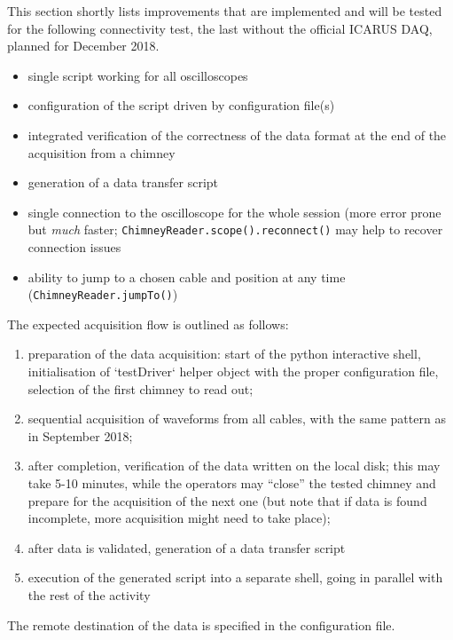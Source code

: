 This section shortly lists improvements that are implemented and will be tested
for the following connectivity test, the last without the official ICARUS DAQ,
planned for December 2018.
\begin{itemize}
  \item single script working for all oscilloscopes
  \item configuration of the script driven by configuration file(s)
  \item integrated verification of the correctness of the data format at the end
        of the acquisition from a chimney
  \item generation of a data transfer script
  \item single connection to the oscilloscope for the whole session (more error
        prone but \emph{much} faster; \texttt{ChimneyReader.scope().reconnect()}
        may help to recover connection issues
  \item ability to jump to a chosen cable and position at any time
        (\texttt{ChimneyReader.jumpTo()})
\end{itemize}
The expected acquisition flow is outlined as follows:
\begin{enumerate}
  \item preparation of the data acquisition: start of the python interactive
        shell, initialisation of `testDriver` helper object with the proper
        configuration file, selection of the first chimney to read out;
  \item sequential acquisition of waveforms from all cables, with the same
        pattern as in September 2018;
  \item after completion, verification of the data written on the local disk;
        this may take 5-10 minutes, while the operators may ``close'' the tested
        chimney and prepare for the acquisition of the next one (but note that
        if data is found incomplete, more acquisition might need to take place);
  \item after data is validated, generation of a data transfer script
  \item execution of the generated script into a separate shell, going in
        parallel with the rest of the activity
\end{enumerate}
The remote destination of the data is specified in the configuration file.
